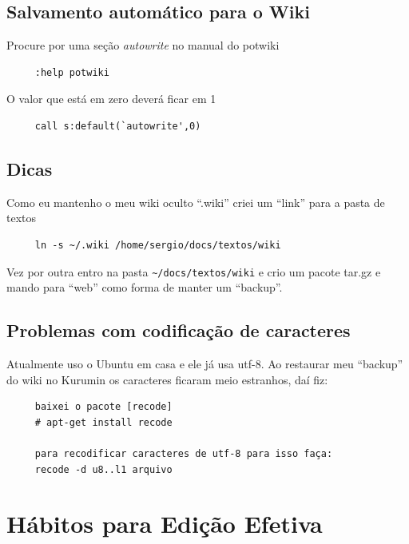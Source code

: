 \documentclass[10pt,a4paper,openany]{book}
\begin{document}
\section{Salvamento automático para o Wiki }
\label{Salvamento automático para o wiki }
Procure por uma seção {\em autowrite} no manual do potwiki

\begin{verbatim}
     :help potwiki
\end{verbatim}

O valor que está em zero deverá ficar em 1

\begin{verbatim}
     call s:default(`autowrite',0)
\end{verbatim}

\section{Dicas}
\label{Dicas}
Como eu mantenho o meu wiki oculto ``.wiki'' criei um ``link'' para a pasta de textos

\begin{verbatim}
     ln -s ~/.wiki /home/sergio/docs/textos/wiki
\end{verbatim}

Vez por outra entro na pasta \verb|~/docs/textos/wiki| e crio um
pacote tar.gz e mando para ``web'' como forma de manter um ``backup''.

\section{Problemas com codificação de caracteres}
\label{Problemas com codificação de caracteres}

Atualmente uso o Ubuntu em casa e ele já usa utf-8. Ao restaurar meu
``backup'' do wiki no Kurumin os caracteres ficaram meio estranhos,
daí fiz:

\begin{verbatim}
     baixei o pacote [recode]
     # apt-get install recode
     
     para recodificar caracteres de utf-8 para isso faça:
     recode -d u8..l1 arquivo
\end{verbatim}

\chapter{Hábitos para Edição Efetiva}
\label{cha:Hábitos para edição efetiva}
\end{document}
